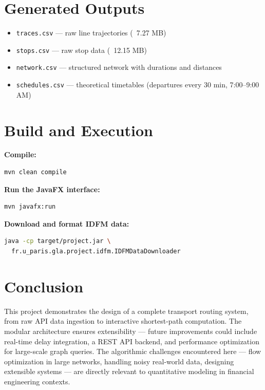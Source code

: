 \documentclass[12pt,a4paper]{article}
\begin{document}
\section{Generated Outputs}

\begin{itemize}
    \item \texttt{traces.csv} --- raw line trajectories (~7.27 MB)
    \item \texttt{stops.csv} --- raw stop data (~12.15 MB)
    \item \texttt{network.csv} --- structured network with durations and distances
    \item \texttt{schedules.csv} --- theoretical timetables (departures every 30 min, 7:00--9:00 AM)
\end{itemize}

\section{Build and Execution}

\textbf{Compile:}
\begin{lstlisting}[language=bash]
mvn clean compile
\end{lstlisting}

\textbf{Run the JavaFX interface:}
\begin{lstlisting}[language=bash]
mvn javafx:run
\end{lstlisting}

\textbf{Download and format IDFM data:}
\begin{lstlisting}[language=bash]
java -cp target/project.jar \
  fr.u_paris.gla.project.idfm.IDFMDataDownloader
\end{lstlisting}

\section{Conclusion}

This project demonstrates the design of a complete transport routing system, from raw API data ingestion to interactive shortest-path computation. The modular architecture ensures extensibility --- future improvements could include real-time delay integration, a REST API backend, and performance optimization for large-scale graph queries. The algorithmic challenges encountered here --- flow optimization in large networks, handling noisy real-world data, designing extensible systems --- are directly relevant to quantitative modeling in financial engineering contexts.
\end{document}
